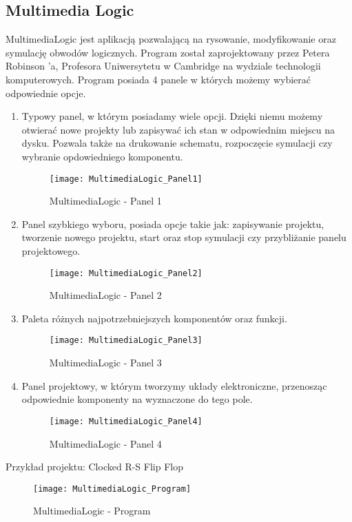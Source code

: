 \documentclass[12pt, a4paper, onside, polish]{article}				%
\begin{document}
\cleardoublepage

\subsection{Multimedia Logic}
\hspace{\parindent}
MultimediaLogic jest aplikacją pozwalającą na rysowanie, modyfikowanie oraz symulację obwodów logicznych.  Program został zaprojektowany przez Petera Robinson ’a, Profesora Uniwersytetu w Cambridge na wydziale technologii komputerowych.  \newline\newline
Program posiada 4 panele w których możemy wybierać odpowiednie opcje.

 \begin{enumerate}
\item Typowy panel, w którym posiadamy wiele opcji. Dzięki niemu możemy otwierać nowe projekty lub zapisywać ich stan w odpowiednim miejscu na dysku. Pozwala także na drukowanie schematu, rozpoczęcie symulacji czy wybranie opdowiedniego komponentu.
  	\begin{figure}[hbt!]
  	  {\centering \texttt{[image: MultimediaLogic\_Panel1]} \caption{MultimediaLogic - Panel 1}}\vspace{5mm}
  	  \end{figure}
  	  
\item Panel szybkiego wyboru, posiada opcje takie jak: zapisywanie projektu, tworzenie nowego projektu, start oraz stop symulacji czy przybliżanie panelu projektowego.
  	\begin{figure}[hbt!]
  	  {\centering \texttt{[image: MultimediaLogic\_Panel2]} \caption{MultimediaLogic - Panel 2}}\vspace{5mm}
  	 \end{figure}
  	 
 \item Paleta różnych najpotrzebniejszych komponentów oraz funkcji. 
  	\begin{figure}[hbt!]
  	  {\centering \texttt{[image: MultimediaLogic\_Panel3]} \caption{MultimediaLogic - Panel 3}}\vspace{5mm}
  	 \end{figure}
  	 
\cleardoublepage
\item  Panel projektowy, w którym tworzymy układy elektroniczne, przenosząc odpowiednie komponenty na wyznaczone do tego pole.
  	\begin{figure}[hbt!]
  	  {\centering \texttt{[image: MultimediaLogic\_Panel4]} \caption{MultimediaLogic - Panel 4}}\vspace{5mm}
  	 \end{figure}
\end {enumerate}
Przykład projektu: Clocked R-S Flip Flop
  	\begin{figure}[hbt!]
  	  {\centering \texttt{[image: MultimediaLogic\_Program]} \caption{MultimediaLogic - Program}}\vspace{5mm}
  	 \end{figure}
\cleardoublepage
\end{document}

